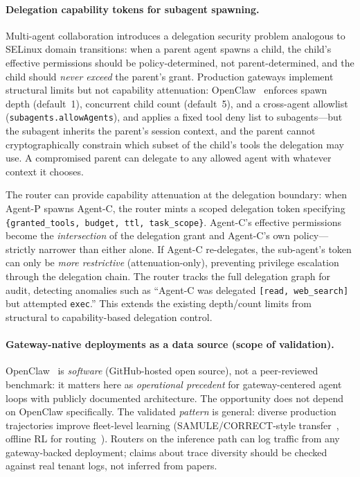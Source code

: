 \begin{opportunity}
\paragraph{Delegation capability tokens for subagent spawning.}
Multi-agent collaboration introduces a delegation security
problem analogous to SELinux domain transitions: when a parent agent
spawns a child, the child's effective permissions should be
policy-determined, not parent-determined, and the child should
\emph{never exceed} the parent's grant.  Production gateways
implement structural limits but not capability attenuation:
OpenClaw~\cite{openclaw2026} enforces spawn depth (default~1),
concurrent child count (default~5), and a cross-agent allowlist
(\texttt{subagents.allowAgents}), and applies a fixed tool deny list
to subagents---but the subagent inherits the parent's session
context, and the parent cannot cryptographically constrain which
subset of the child's tools the delegation may use.  A compromised
parent can delegate to any allowed agent with whatever context it
chooses.

The router can provide capability attenuation at the delegation
boundary: when Agent-P spawns Agent-C, the router mints a scoped
delegation token specifying
\texttt{\{granted\_tools, budget, ttl, task\_scope\}}.  Agent-C's
effective permissions become the \emph{intersection} of the
delegation grant and Agent-C's own policy---strictly narrower than
either alone.  If Agent-C re-delegates, the sub-agent's token can
only be \emph{more restrictive} (attenuation-only), preventing
privilege escalation through the delegation chain.  The router
tracks the full delegation graph for audit, detecting anomalies
such as ``Agent-C was delegated \texttt{[read, web\_search]} but
attempted \texttt{exec}.''  This extends the existing depth/count
limits from structural to capability-based delegation control.

\paragraph{Gateway-native deployments as a data source (scope of validation).}
OpenClaw~\cite{openclaw2026} is \emph{software} (GitHub-hosted open
source), not a peer-reviewed benchmark: it matters here as
\emph{operational precedent} for gateway-centered agent loops with
publicly documented architecture.  The opportunity does not depend on
OpenClaw specifically.  The validated \emph{pattern} is general:
diverse production trajectories improve fleet-level learning
(SAMULE/CORRECT-style transfer~\cite{samule2025, correct2025},
offline RL for routing~\cite{offlinerl2025scheduling}).  Routers on
the inference path can log traffic from any gateway-backed
deployment; claims about trace diversity should be checked against
real tenant logs, not inferred from papers.


\end{opportunity}
